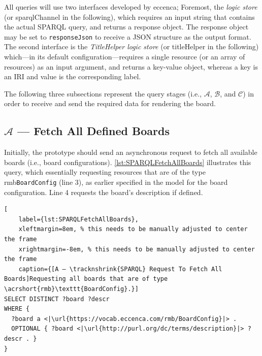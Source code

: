 \noindent All queries will use two interfaces developed by eccenca; Foremost, the \textit{ logic store} (or sparqlChannel in the following), which requires an input string that contains the actual \acrshort*{SPARQL} query, and returns a response object. The response object may be set to \texttt{responseJson} to receive a \acrshort*{JSON} structure as the output format. The second interface is the \textit{TitleHelper logic store} (or titleHelper in the following) which---in its default configuration---requires a single resource (or an array of resources) as an input argument, and returns a key-value object, whereas a key is an \acrshort*{IRI} and value is the corresponding label.

The following three subsections represent the query stages (i.e., {\small \hyperref[ssec:QS-A]{\(\mathcal{A}\)}}, {\small \hyperref[ssec:QS-B]{\(\mathcal{B}\)}}, and {\small \hyperref[ssec:QS-C]{\(\mathcal{C}\)}}) in order to receive and send the required data for rendering the board.



\subsection[A — Fetch All Defined Boards]{\(\mathcal{A}\) — Fetch All Defined Boards}\label{ssec:QS-A}

Initially, the prototype should send an asynchronous request to fetch all available boards (i.e., board configurations). \autoref{lst:SPARQLFetchAllBoards} illustrates this query, which essentially requesting resources that are of the type \acrshort{rmb}\texttt{BoardConfig} (line 3), as earlier specified in the model for the board configuration. Line 4 requests the board’s description if defined.


\begin{spacing}{0.9}
    \lstset{language=SPARQL,escapechar=|}
    \begin{lstlisting}[
    label={lst:SPARQLFetchAllBoards},
    xleftmargin=8em, % this needs to be manually adjusted to center the frame
    xrightmargin=-8em, % this needs to be manually adjusted to center the frame
    caption={[A — \tracknshrink{SPARQL} Request To Fetch All Boards]Requesting all boards that are of type \acrshort{rmb}\texttt{BoardConfig}.}]
SELECT DISTINCT ?board ?descr
WHERE {
  ?board a <|\url{https://vocab.eccenca.com/rmb/BoardConfig}|> .
  OPTIONAL { ?board <|\url{http://purl.org/dc/terms/description}|> ?descr . }
}
\end{lstlisting}
\end{spacing}

